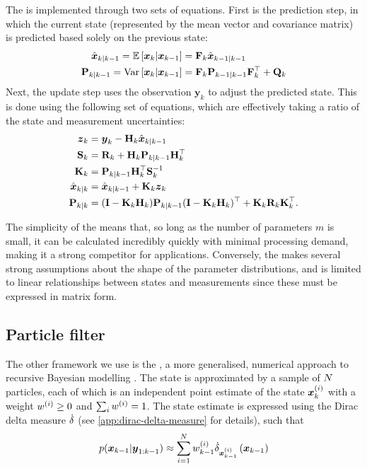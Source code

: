 The \kf{} is implemented through two sets of equations. First is the prediction step, in which the current state (represented by the mean vector and covariance matrix) is predicted based solely on the previous state:
\begin{equation}
\label{eq:ch2:kf_predict}
\begin{split}
\hat{\boldsymbol x}_{k|k-1} = \mathbb{E}\left[\boldsymbol x_k | \boldsymbol x_{k-1}\right]
    &= \mathbf{F}_k \hat{\boldsymbol x}_{k-1|k-1} \\
\mathbf{P}_{k|k-1} = \mathrm{Var}\left[\boldsymbol x_k | \boldsymbol x_{k-1}\right]
    &= \mathbf{F}_k \mathbf{P}_{k-1|k-1} \mathbf{F}_k^\top + \mathbf{Q}_k
\end{split}
\end{equation}
Next, the update step uses the observation $\boldsymbol{y}_k$ to adjust the predicted state. This is done using the following set of equations, which are effectively taking a ratio of the state and measurement uncertainties:
\begin{equation}
\label{eq:ch2:kf_update}
\begin{split}
\boldsymbol z_k &= \boldsymbol{y}_k - \mathbf{H}_k \hat{\boldsymbol x}_{k|k-1} \\
\mathbf{S}_k &= \mathbf{R}_k + \mathbf{H}_k \mathbf{P}_{k|k-1} \mathbf{H}_k^\top \\
\mathbf{K}_k &= \mathbf{P}_{k|k-1} \mathbf{H}_k^\top \mathbf{S}_k^{-1} \\
\hat{\boldsymbol x}_{k|k} &= \hat{\boldsymbol x}_{k|k-1} + \mathbf{K}_k \boldsymbol z_k \\
\mathbf{P}_{k|k} &= (\mathbf{I} - \mathbf{K}_k \mathbf{H}_k) \mathbf{P}_{k|k-1}
    (\mathbf{I} - \mathbf{K}_k \mathbf{H}_k)^\top + \mathbf{K}_k \mathbf{R}_k \mathbf{K}_k^\top.
\end{split}
\end{equation}


The simplicity of the \kf{} means that, so long as the number of parameters $m$ is small, it can be calculated incredibly quickly with minimal processing demand, making it a strong competitor for \rt{} applications. Conversely, the \kf{} makes several strong assumptions about the shape of the parameter distributions, and is limited to linear relationships between states and measurements since these must be expressed in matrix form.



\subsection{Particle filter}
\label{sec:pf}

The other framework we use is the \pf{}, a more generalised, numerical approach to recursive Bayesian modelling \citep{Gordon_1993}. The state is approximated by a sample of $N$ particles, each of which is an independent point estimate of the state $\boldsymbol x^{(i)}_k$ with a weight $w^{(i)} \geq 0$ and $\sum_i w^{(i)} = 1$. The state estimate is expressed using the Dirac delta measure $\dot\delta$ (see \cref{app:dirac-delta-measure} for details), such that
\begin{equation}
\label{eq:pf_state}
p(\boldsymbol x_{k-1} | \boldsymbol{y}_{1:k-1}) \approx
\sum_{i=1}^N w^{(i)}_{k-1} \dot\delta_{\boldsymbol x^{(i)}_{k-1}}\left(\boldsymbol x_{k-1}\right)
\end{equation}

